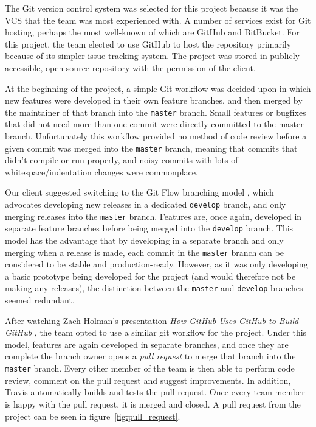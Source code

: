 \documentclass[a4paper, 12pt, twoside]{article}
\begin{document}
The Git version control system was selected for this project because it was the VCS that the team was most experienced with. A number of services exist for Git hosting, perhaps the most well-known of which are GitHub and BitBucket. For this project, the team elected to use GitHub to host the repository primarily because of its simpler issue tracking system. The project was stored in publicly accessible, open-source repository with the permission of the client.

At the beginning of the project, a simple Git workflow was decided upon in which new features were developed in their own feature branches, and then merged by the maintainer of that branch into the \texttt{master} branch. Small features or bugfixes that did not need more than one commit were directly committed to the master branch. Unfortunately this workflow provided no method of code review before a given commit was merged into the \texttt{master} branch, meaning that commits that didn't compile or run properly, and noisy commits with lots of whitespace/indentation changes were commonplace.

Our client suggested switching to the Git Flow branching model \cite{Driessen2010}, which advocates developing new releases in a dedicated \texttt{develop} branch, and only merging releases into the \texttt{master} branch. Features are, once again, developed in separate feature branches before being merged into the \texttt{develop} branch. This model has the advantage that by developing in a separate branch and only merging when a release is made, each commit in the \texttt{master} branch can be considered to be stable and production-ready. However, as it was only developing a basic prototype being developed for the project (and would therefore not be making any releases), the distinction between the \texttt{master} and \texttt{develop} branches seemed redundant.

After watching Zach Holman's presentation \emph{How GitHub Uses GitHub to Build GitHub} \cite{hgugtbg}, the team opted to use a similar git workflow for the project. Under this model, features are again developed in separate branches, and once they are complete the branch owner opens a \emph{pull request} to merge that branch into the \texttt{master} branch. Every other member of the team is then able to perform code review, comment on the pull request and suggest improvements. In addition, Travis automatically builds and tests the pull request. Once every team member is happy with the pull request, it is merged and closed. A pull request from the project can be seen in figure~\ref{fig:pull_request}.
\end{document}
